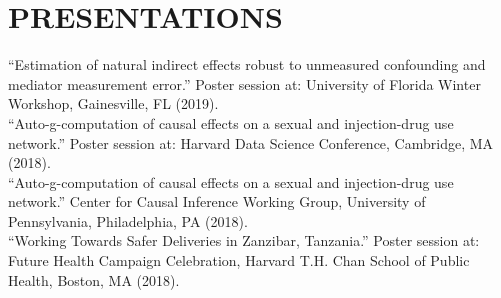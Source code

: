 \documentclass[12pt]{article}
\begin{document}





\section*{\textbf{{\large P}{RESENTATIONS}}}




``Estimation of natural indirect effects robust to unmeasured confounding and mediator measurement error.'' Poster session at: University of Florida Winter Workshop, Gainesville, FL (2019). \\

``Auto-g-computation of causal effects on a sexual and injection-drug use network.'' Poster session at: Harvard Data Science Conference, Cambridge, MA (2018). \\

``Auto-g-computation of causal effects on a sexual and injection-drug use network.'' Center for Causal Inference Working Group, University of Pennsylvania, Philadelphia, PA (2018). \\

``Working Towards Safer Deliveries in Zanzibar, Tanzania.''  Poster session at: Future Health Campaign Celebration, Harvard T.H. Chan School of Public Health, Boston, MA (2018). \\
\end{document}
